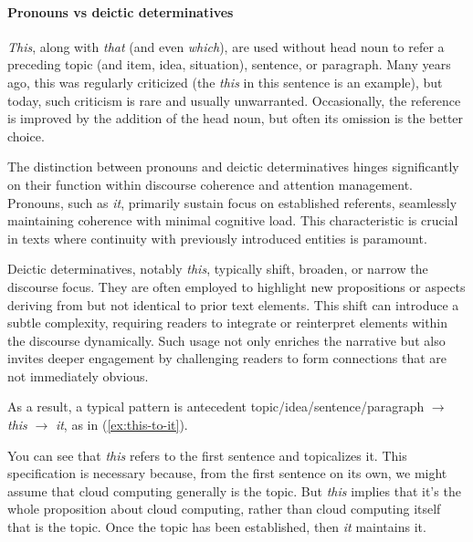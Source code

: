 \paragraph*{Pronouns vs deictic determinatives}

\textit{This}, along with \textit{that} (and even \textit{which}), are used without head noun to refer a preceding topic (and item, idea, situation), sentence, or paragraph. Many years ago, this was regularly criticized (the \textit{this} in this sentence is an example), but today, such criticism is rare and usually unwarranted. Occasionally, the reference is improved by the addition of the head noun, but often its omission is the better choice.

The distinction between pronouns and deictic determinatives hinges significantly on their function within discourse coherence and attention management. Pronouns, such as \textit{it}, primarily sustain focus on established referents, seamlessly maintaining coherence with minimal cognitive load. This characteristic is crucial in texts where continuity with previously introduced entities is paramount.

Deictic determinatives, notably \textit{this}, typically shift, broaden, or narrow the discourse focus. They are often employed to highlight new propositions or aspects deriving from but not identical to prior text elements. This shift can introduce a subtle complexity, requiring readers to integrate or reinterpret elements within the discourse dynamically. Such usage not only enriches the narrative but also invites deeper engagement by challenging readers to form connections that are not immediately obvious.

As a result, a typical pattern is antecedent topic/idea/sentence/paragraph $\rightarrow$ \textit{this} $\rightarrow$ \textit{it}, as in (\ref{ex:this-to-it}).

\label{ex:this-to-it}
\z

You can see that \textit{this} refers to the first sentence and topicalizes it. This specification is necessary because, from the first sentence on its own, we might assume that cloud computing generally is the topic. But \textit{this} implies that it's the whole proposition about cloud computing, rather than cloud computing itself that is the topic. Once the topic has been established, then \textit{it} maintains it.

